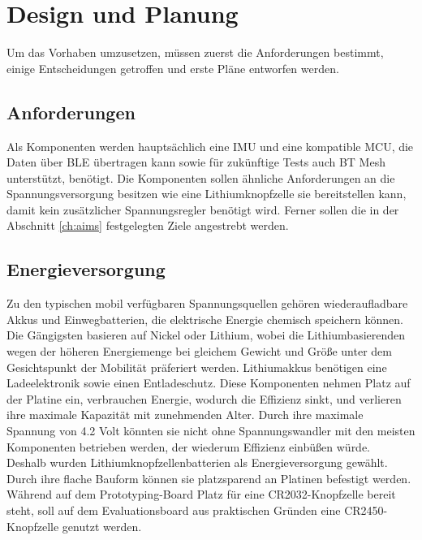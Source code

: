 \chapter{Design und Planung}
\label{ch:design}
Um das Vorhaben umzusetzen, müssen zuerst die Anforderungen bestimmt, einige Entscheidungen getroffen und erste Pläne entworfen werden.

\section{Anforderungen}
Als Komponenten werden hauptsächlich eine IMU und eine kompatible MCU, die Daten über BLE übertragen kann sowie für zukünftige Tests auch BT Mesh unterstützt, benötigt.
Die Komponenten sollen ähnliche Anforderungen an die Spannungsversorgung besitzen wie eine Lithiumknopfzelle sie bereitstellen kann, damit kein zusätzlicher Spannungsregler benötigt wird.
Ferner sollen die in der Abschnitt \ref{ch:aims} festgelegten Ziele angestrebt werden.

\section{Energieversorgung}
Zu den typischen mobil verfügbaren Spannungsquellen gehören wiederaufladbare Akkus und Einwegbatterien, die elektrische Energie chemisch speichern können.
Die Gängigsten basieren auf Nickel oder Lithium, wobei die Lithiumbasierenden wegen der höheren Energiemenge bei gleichem Gewicht und Größe unter dem Gesichtspunkt der Mobilität präferiert werden.
Lithiumakkus benötigen eine Ladeelektronik sowie einen Entladeschutz.
Diese Komponenten nehmen Platz auf der Platine ein, verbrauchen Energie, wodurch die Effizienz sinkt, und verlieren ihre maximale Kapazität mit zunehmenden Alter.
Durch ihre maximale Spannung von 4.2 Volt könnten sie nicht ohne Spannungswandler mit den meisten Komponenten betrieben werden, der wiederum Effizienz einbüßen würde. \cite{site_liion}\\
Deshalb wurden Lithiumknopfzellenbatterien als Energieversorgung gewählt.
Durch ihre flache Bauform können sie platzsparend an Platinen befestigt werden.
Während auf dem Prototyping-Board Platz für eine CR2032-Knopfzelle bereit steht, soll auf dem Evaluationsboard aus praktischen Gründen eine CR2450-Knopfzelle genutzt werden.

